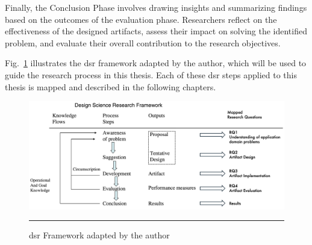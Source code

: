 Finally, the Conclusion Phase involves drawing insights and summarizing findings based on the outcomes of the evaluation phase.
Researchers reflect on the effectiveness of the designed artifacts, assess their impact on solving the identified problem, and evaluate their overall contribution to the research objectives.

Fig.~\ref{fig:design-science-research-framework-adapted-by-author} illustrates the \gls{dsr} framework adapted by the author, which will be used to guide the research process in this thesis.
Each of these \gls{dsr} steps applied to this thesis is mapped and described in the following chapters.
\begin{figure}[htbp]
    \centering
 \includegraphics[width=.9\textwidth]{figures/research-design/design-science-research-framework-by-author.png}
     \rule{35em}{0.5pt}
    \caption{\acrlong{dsr} Framework adapted by the author} 
 \label{fig:design-science-research-framework-adapted-by-author}
\end{figure}